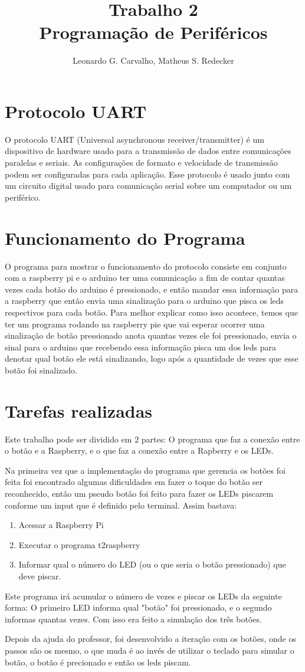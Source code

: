 \documentclass[12pt]{article}
\title{Trabalho 2 \\ Programação de Periféricos}
\author{Leonardo G. Carvalho\inst{1}, Matheus S. Redecker\inst{1}}
\begin{document}
 

\maketitle


\section{Protocolo UART}
O protocolo UART (Universal asynchronous receiver/transmitter) é um dispositivo de hardware usado para a transmissão de dados entre comunicações paralelas e seriais. As configurações de formato e velocidade de transmissão podem ser configuradas para cada aplicação. Esse protocolo é usado junto com um circuito digital usado para comunicação serial sobre um computador ou um periférico. 

\section{Funcionamento do Programa}

O programa para mostrar o funcionamento do protocolo consiste em conjunto com a raspberry pi e o arduino ter uma comunicação a fim de contar quantas vezes cada botão do arduino é pressionado, e então mandar essa informação para a raspberry que então envia uma sinalização para o arduino que pisca os leds respectivos para cada botão. Para melhor explicar como isso acontece, temos que ter um programa rodando na raspberry pie que vai esperar ocorrer uma sinalização de botão pressionado anota quantas vezes ele foi pressionado, envia o sinal para o arduino que recebendo essa informação pisca um dos leds para denotar qual botão ele está sinalizando, logo após a quantidade de vezes que esse botão foi sinalizado.

\section{Tarefas realizadas}
Este trabalho pode ser dividido em 2 partes: O programa que faz a conexão entre o botão e a Raspberry, e o que faz a conexão entre a Rapberry e os LEDs.

Na primeira vez que a implementação do programa que gerencia os botões foi feita foi encontrado algumas dificuldades em fazer o toque do botão ser reconhecido, então um pseudo botão foi feito para fazer os LEDs piscarem conforme um input que é definido pelo terminal. Assim bastava:
\begin{enumerate}
\item Acessar a Raspberry Pi
\item Executar o programa t2raspberry
\item Informar qual o número do LED (ou o que seria o botão pressionado) que deve piscar.
\end{enumerate}
Este programa irá acumular o número de vezes e piscar os LEDs da seguinte forma: O primeiro LED informa qual "botão" foi pressionado, e o segundo informas quantas vezes. Com isso era feito a simulação dos três botões.

Depois da ajuda do professor, foi desenvolvido a iteração com os botões, onde os passos são os mesmo, o que muda é ao invés de utilizar o teclado para simular o botão, o botão é precionado e então os leds piscam.
\end{document}
